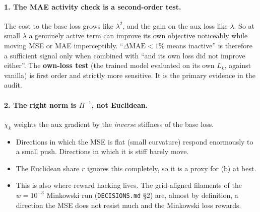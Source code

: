 \documentclass[11pt,a4paper]{article}
\theoremstyle{definition}
\theoremstyle{remark}
\begin{document}
\paragraph{1. The MAE activity check is a second-order test.}
The cost to the base loss grows like $\lambda^2$, and the gain on the aux loss like
$\lambda$. So at small $\lambda$ a genuinely active term can improve its own objective
noticeably while moving MSE or MAE imperceptibly. ``$\Delta\mathrm{MAE}<1\%$ means
inactive'' is therefore a sufficient signal only when combined with ``and its own loss did
not improve either''. The \textbf{own-loss test} (the trained model evaluated on its own
$L_k$, against vanilla) is first order and strictly more sensitive. It is the primary
evidence in the audit.

\paragraph{2. The right norm is $H^{-1}$, not Euclidean.}
$\chi_k$ weights the aux gradient by the \emph{inverse} stiffness of the base loss.
\begin{itemize}[nosep]
\item Directions in which the MSE is flat (small curvature) respond enormously to a small
  push. Directions in which it is stiff barely move.
\item The Euclidean share $r$ ignores this completely, so it is a proxy for (b) at best.
\item This is also where reward hacking lives. The grid-aligned filaments of the
  $w=10^{-3}$ Minkowski run (\texttt{DECISIONS.md} \S2) are, almost by definition, a
  direction the MSE does not resist much and the Minkowski loss rewards.
\end{itemize}
\end{document}
